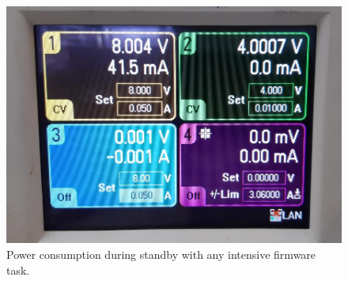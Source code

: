 \begin{figure}[!ht]
    \begin{center}
        \includegraphics[width=\columnwidth]{figures/v01/power-consumption.jpg}
        \caption{Power consumption during standby with any intensive firmware task.}
        \label{fig:power-consumption}
    \end{center}
\end{figure}


